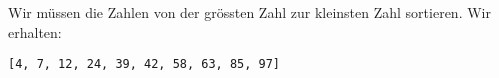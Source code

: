 %
%
\begin{minipage}{\linewidth}
Wir müssen die Zahlen von der grössten Zahl zur kleinsten Zahl sortieren. Wir erhalten:
\begin{center}
\lstinline{[4, 7, 12, 24, 39, 42, 58, 63, 85, 97]}
\end{center}
\end{minipage}
